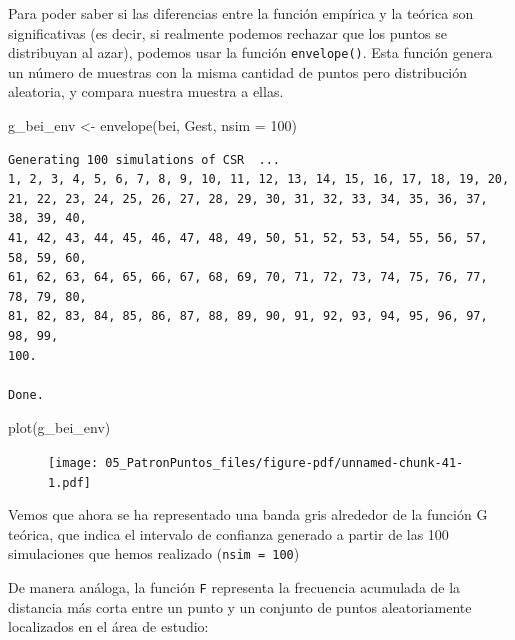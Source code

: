 \documentclass[
  letterpaper,
  DIV=11,
  numbers=noendperiod]{scrreprt}
\newenvironment{Shaded}{\begin{snugshade}}{\end{snugshade}}
\newcommand{\AttributeTok}[1]{\textcolor[rgb]{0.40,0.45,0.13}{#1}}
\newcommand{\DecValTok}[1]{\textcolor[rgb]{0.68,0.00,0.00}{#1}}
\newcommand{\FunctionTok}[1]{\textcolor[rgb]{0.28,0.35,0.67}{#1}}
\newcommand{\NormalTok}[1]{\textcolor[rgb]{0.00,0.23,0.31}{#1}}
\newcommand{\OtherTok}[1]{\textcolor[rgb]{0.00,0.23,0.31}{#1}}
\begin{document}
Para poder saber si las diferencias entre la función empírica y la
teórica son significativas (es decir, si realmente podemos rechazar que
los puntos se distribuyan al azar), podemos usar la función
\texttt{envelope()}. Esta función genera un número de muestras con la
misma cantidad de puntos pero distribución aleatoria, y compara nuestra
muestra a ellas.

\begin{Shaded}
\begin{Highlighting}[]
\NormalTok{g\_bei\_env }\OtherTok{\textless{}{-}} \FunctionTok{envelope}\NormalTok{(bei, Gest, }\AttributeTok{nsim =} \DecValTok{100}\NormalTok{)}
\end{Highlighting}
\end{Shaded}

\begin{verbatim}
Generating 100 simulations of CSR  ...
1, 2, 3, 4, 5, 6, 7, 8, 9, 10, 11, 12, 13, 14, 15, 16, 17, 18, 19, 20,
21, 22, 23, 24, 25, 26, 27, 28, 29, 30, 31, 32, 33, 34, 35, 36, 37, 38, 39, 40,
41, 42, 43, 44, 45, 46, 47, 48, 49, 50, 51, 52, 53, 54, 55, 56, 57, 58, 59, 60,
61, 62, 63, 64, 65, 66, 67, 68, 69, 70, 71, 72, 73, 74, 75, 76, 77, 78, 79, 80,
81, 82, 83, 84, 85, 86, 87, 88, 89, 90, 91, 92, 93, 94, 95, 96, 97, 98, 99, 
100.

Done.
\end{verbatim}

\begin{Shaded}
\begin{Highlighting}[]
\FunctionTok{plot}\NormalTok{(g\_bei\_env)}
\end{Highlighting}
\end{Shaded}

\begin{figure}[H]

{\centering \texttt{[image: 05\_PatronPuntos\_files/figure-pdf/unnamed-chunk-41-1.pdf]}

}

\end{figure}

Vemos que ahora se ha representado una banda gris alrededor de la
función G teórica, que indica el intervalo de confianza generado a
partir de las 100 simulaciones que hemos realizado
(\texttt{nsim\ =\ 100})

De manera análoga, la función \texttt{F} representa la frecuencia
acumulada de la distancia más corta entre un punto y un conjunto de
puntos aleatoriamente localizados en el área de estudio:
\end{document}
